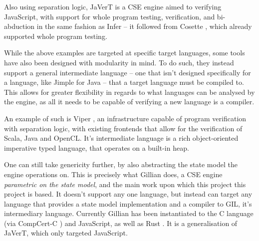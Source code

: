 Also using separation logic, JaVerT \cite{javert1, javert2} is a CSE engine aimed to verifying JavaScript, with support for whole program testing, verification, and bi-abduction in the same fashion as Infer -- it followed from Cosette \cite{cosette}, which already supported whole program testing.

While the above examples are targeted at specific target languages, some tools have also been designed with modularity in mind. To do such, they instead support a general intermediate language -- one that isn't designed specifically for a language, like Jimple for Java -- that a target language must be compiled to. This allows for greater flexibility in regards to what languages can be analysed by the engine, as all it needs to be capable of verifying a new language is a compiler.

An example of such is Viper \cite{viper}, an infrastructure capable of program verification with separation logic, with existing frontends that allow for the verification of Scala, Java and OpenCL. It's intermediate language is a rich object-oriented imperative typed language, that operates on a built-in heap.

One can still take genericity further, by also abstracting the state model the engine operations on. This is precisely what Gillian \cite{gillian0, gillian1, gillian2} does, a CSE engine \emph{parametric on the state model}, and the main work upon which this project this project is based. It doesn't support any one language, but instead can target any language that provides a state model implementation and a compiler to GIL, it's intermediary language. Currently Gillian has been instantiated to the C language (via CompCert-C \cite{compcert}) and JavaScript, as well as Rust \cite{gillianrust}. It is a generalisation of JaVerT, which only targeted JavaScript.

